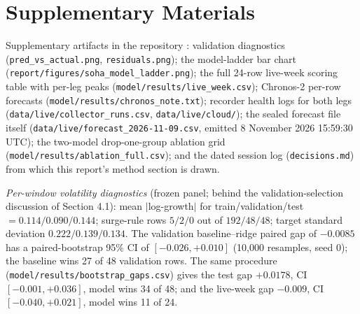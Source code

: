 \documentclass[10pt,letterpaper]{article}
\begin{document}
{\small


}

\clearpage
\section*{Supplementary Materials}
Supplementary artifacts in the repository \citep{group18repo}: validation diagnostics (\texttt{pred\_vs\_actual.png}, \texttt{residuals.png}); the model-ladder bar chart (\texttt{report/figures/soha\_model\_ladder.png}); the full 24-row live-week scoring table with per-leg peaks (\texttt{model/results/live\_week.csv}); Chronos-2 per-row forecasts (\texttt{model/results/chronos\_note.txt}); recorder health logs for both legs (\texttt{data/live/collector\_runs.csv}, \texttt{data/live/cloud/}); the sealed forecast file itself (\texttt{data/live/forecast\_2026-11-09.csv}, emitted 8 November 2026 15:59:30 UTC); the two-model drop-one-group ablation grid (\texttt{model/results/ablation\_full.csv}); and the dated session log (\texttt{decisions.md}) from which this report's method section is drawn.

\smallskip
\noindent\emph{Per-window volatility diagnostics} (frozen panel; behind the validation-selection discussion of Section 4.1): mean $|$log-growth$|$ for train/validation/test $= 0.114/0.090/0.144$; surge-rule rows $5/2/0$ out of $192/48/48$; target standard deviation $0.222/0.139/0.134$. The validation baseline--ridge paired gap of $-0.0085$ has a paired-bootstrap 95\% CI of $[-0.026, +0.010]$ (10{,}000 resamples, seed 0); the baseline wins 27 of 48 validation rows. The same procedure (\texttt{model/results/bootstrap\_gaps.csv}) gives the test gap $+0.0178$, CI $[-0.001, +0.036]$, model wins 34 of 48; and the live-week gap $-0.009$, CI $[-0.040, +0.021]$, model wins 11 of 24.
\end{document}
